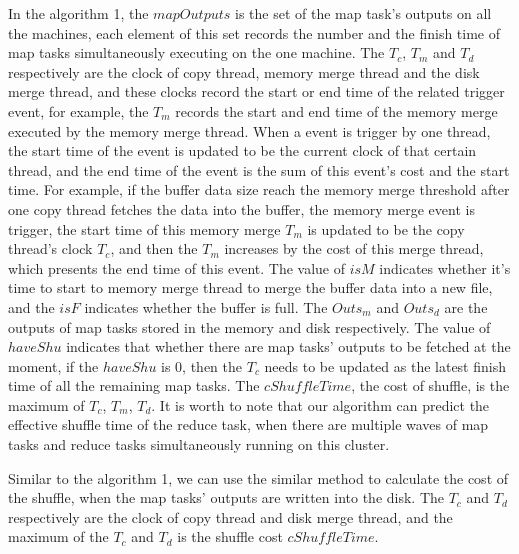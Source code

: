 In the algorithm 1, the $mapOutputs$ is the set of the map task's outputs on all the machines, each element of this set records the number and the finish time of map tasks simultaneously executing on the one machine. The $T_c$, $T_m$ and $T_d$ respectively are the clock of copy thread, memory merge thread and the disk merge thread, and these clocks record the start or end time of the related trigger event, for example, the $T_m$ records the start and end time of the memory merge executed by the memory merge thread. When a event is trigger by one thread, the start time of the event is updated to be the current clock of that certain thread, and the end time of the event is the sum of this event's cost and the start time. For example, if the buffer data size reach the memory merge threshold after one copy thread fetches the data into the buffer, the memory merge event is trigger, the start time of this memory merge $T_m$ is updated to be the copy thread's clock $T_c$, and then the $T_m$ increases by the cost of this merge thread, which presents the end time of this event. The value of $isM$ indicates whether it's time to start to memory merge thread to merge the buffer data into a new file, and the $isF$ indicates whether the buffer is full. The $Outs_m$ and $Outs_d$ are the outputs of map tasks stored in the memory and disk respectively. The value of $haveShu$ indicates that whether there are map tasks' outputs to be fetched at the moment, if the $haveShu$ is 0, then the $T_c$ needs to be updated as the latest finish time of all the remaining map tasks. The $cShuffleTime$, the cost of shuffle, is the maximum of $T_c$, $T_m$, $T_d$. It is worth to note that our algorithm can predict the effective shuffle time of the reduce task, when there are multiple waves of map tasks and reduce tasks simultaneously running on this cluster.

Similar to the algorithm 1, we can use the similar method to calculate the cost of the shuffle, when the map tasks' outputs are written into the disk.  The $T_c$ and $T_d$ respectively are the clock of copy thread and disk merge thread, and the maximum of the $T_c$ and $T_d$ is the shuffle cost $cShuffleTime$.

